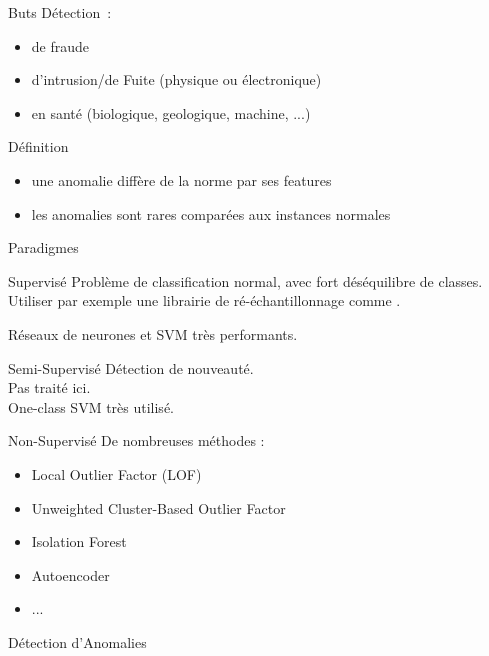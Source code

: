 \begin{frame}{Buts}
  Détection~:
  \begin{itemize}
  \item de fraude
  \item d'intrusion/de Fuite (physique ou électronique)
  \item en santé (biologique, geologique, machine, ...)
  \end{itemize}
\end{frame}

\begin{frame}{Définition}
  \begin{itemize}
  \item une anomalie diffère de la norme par ses features
  \item les anomalies sont rares comparées aux instances normales
  \end{itemize}
\end{frame}

\begin{frame}{Paradigmes}
\end{frame}

\begin{frame}{Supervisé}
  Problème de classification normal, avec fort déséquilibre de classes.
  Utiliser par exemple une librairie de ré-échantillonnage comme .

  Réseaux de neurones et SVM très performants.
\end{frame}

\begin{frame}{Semi-Supervisé}
  Détection de nouveauté. \\
  Pas traité ici. \\
  One-class SVM très utilisé.
\end{frame}

\begin{frame}{Non-Supervisé}
  De nombreuses méthodes : 
  \begin{itemize}
  \item Local Outlier Factor (LOF)
  \item Unweighted Cluster-Based Outlier Factor
  \item Isolation Forest
  \item Autoencoder
  \item ...
  \end{itemize}
\end{frame}

\begin{frame}{Détection d'Anomalies}
\end{frame}



